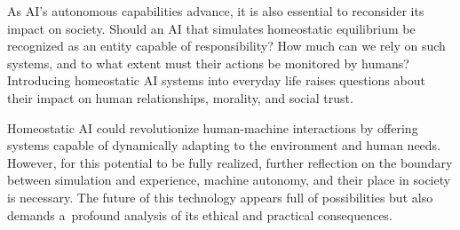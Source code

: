 \documentclass[%
  manuscript=article,
  year=2024,
  volume=77,
  doi=00000.000,
]{zfn}
\begin{document}
As AI's autonomous capabilities advance, it is also essential to reconsider its impact on society. Should an AI that simulates homeostatic equilibrium be recognized as an entity capable of responsibility? How much can we rely on such systems, and to what extent must their actions be monitored by humans? Introducing homeostatic AI systems into everyday life raises questions about their impact on human relationships, morality, and social trust.



Homeostatic AI could revolutionize human-machine interactions by offering systems capable of dynamically adapting to the environment and human needs. However, for this potential to be fully realized, further reflection on the boundary between simulation and experience, machine autonomy, and their place in society is necessary. The future of this technology appears full of possibilities but also demands a~profound analysis of its ethical and practical consequences.




\printbibliography
\end{document}
